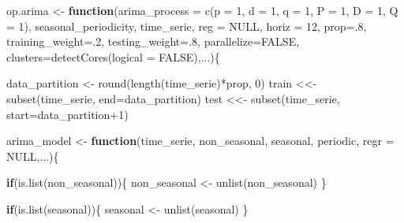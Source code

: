 \documentclass[
]{article}
\newenvironment{Shaded}{\begin{snugshade}}{\end{snugshade}}
\newcommand{\AttributeTok}[1]{\textcolor[rgb]{0.77,0.63,0.00}{#1}}
\newcommand{\ConstantTok}[1]{\textcolor[rgb]{0.00,0.00,0.00}{#1}}
\newcommand{\ControlFlowTok}[1]{\textcolor[rgb]{0.13,0.29,0.53}{\textbf{#1}}}
\newcommand{\DecValTok}[1]{\textcolor[rgb]{0.00,0.00,0.81}{#1}}
\newcommand{\FunctionTok}[1]{\textcolor[rgb]{0.00,0.00,0.00}{#1}}
\newcommand{\NormalTok}[1]{#1}
\newcommand{\OtherTok}[1]{\textcolor[rgb]{0.56,0.35,0.01}{#1}}
\newcommand{\SpecialCharTok}[1]{\textcolor[rgb]{0.00,0.00,0.00}{#1}}
\begin{document}
\label{funcion_op_arima}

\begin{Shaded}
\begin{Highlighting}[]
\NormalTok{op.arima }\OtherTok{\textless{}{-}} \ControlFlowTok{function}\NormalTok{(}\AttributeTok{arima\_process =} \FunctionTok{c}\NormalTok{(}\AttributeTok{p =} \DecValTok{1}\NormalTok{, }\AttributeTok{d =} \DecValTok{1}\NormalTok{, }\AttributeTok{q =} \DecValTok{1}\NormalTok{,}
                                       \AttributeTok{P =} \DecValTok{1}\NormalTok{, }\AttributeTok{D =} \DecValTok{1}\NormalTok{, }\AttributeTok{Q =} \DecValTok{1}\NormalTok{),}
\NormalTok{                     seasonal\_periodicity,}
\NormalTok{                     time\_serie, }\AttributeTok{reg =} \ConstantTok{NULL}\NormalTok{, }\AttributeTok{horiz =} \DecValTok{12}\NormalTok{,}
                     \AttributeTok{prop=}\NormalTok{.}\DecValTok{8}\NormalTok{, }\AttributeTok{training\_weight=}\NormalTok{.}\DecValTok{2}\NormalTok{, }\AttributeTok{testing\_weight=}\NormalTok{.}\DecValTok{8}\NormalTok{,}
                     \AttributeTok{parallelize=}\ConstantTok{FALSE}\NormalTok{,}
                     \AttributeTok{clusters=}\FunctionTok{detectCores}\NormalTok{(}\AttributeTok{logical =} \ConstantTok{FALSE}\NormalTok{),...)\{}

\NormalTok{    data\_partition }\OtherTok{\textless{}{-}} \FunctionTok{round}\NormalTok{(}\FunctionTok{length}\NormalTok{(time\_serie)}\SpecialCharTok{*}\NormalTok{prop, }\DecValTok{0}\NormalTok{)}
\NormalTok{    train }\OtherTok{\textless{}\textless{}{-}} \FunctionTok{subset}\NormalTok{(time\_serie, }\AttributeTok{end=}\NormalTok{data\_partition)}
\NormalTok{    test }\OtherTok{\textless{}\textless{}{-}} \FunctionTok{subset}\NormalTok{(time\_serie, }\AttributeTok{start=}\NormalTok{data\_partition}\SpecialCharTok{+}\DecValTok{1}\NormalTok{)}

\NormalTok{    arima\_model }\OtherTok{\textless{}{-}} \ControlFlowTok{function}\NormalTok{(time\_serie, non\_seasonal, seasonal, periodic, }
                            \AttributeTok{regr =} \ConstantTok{NULL}\NormalTok{,...)\{}

        \ControlFlowTok{if}\NormalTok{(}\FunctionTok{is.list}\NormalTok{(non\_seasonal))\{}
\NormalTok{            non\_seasonal }\OtherTok{\textless{}{-}} \FunctionTok{unlist}\NormalTok{(non\_seasonal)}
\NormalTok{        \}}

        \ControlFlowTok{if}\NormalTok{(}\FunctionTok{is.list}\NormalTok{(seasonal))\{}
\NormalTok{            seasonal }\OtherTok{\textless{}{-}} \FunctionTok{unlist}\NormalTok{(seasonal)}
\NormalTok{        \}}


\end{Highlighting}
\end{Shaded}
\end{document}
